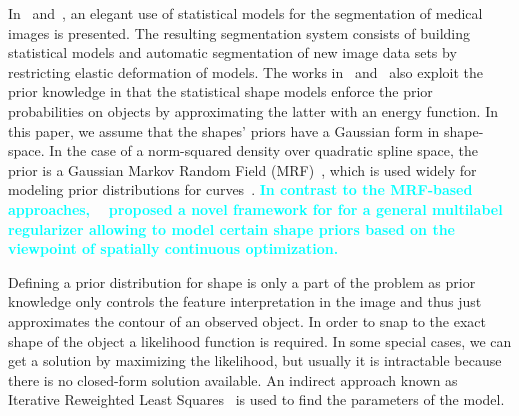 \documentclass[conference]{IEEEtran}
\newcommand{\review}[1]{\textbf{\textcolor{cyan}{#1}}}
\begin{document}
In~\cite{kelemen1999three} and~\cite{kelemen1999elastic}, an elegant
use of statistical models for the segmentation of medical images is
presented. The resulting segmentation system consists of building
statistical models and automatic segmentation of new image data
sets by restricting elastic deformation of models. The works
in~\cite{sclaroff2001deformable} and~\cite{liu1999deformable} also
exploit the prior knowledge in that the statistical shape models enforce the prior
probabilities on objects by approximating the latter with an energy function.  
In this paper, we assume that the shapes' priors have a Gaussian form in
shape-space. In the case of a norm-squared density over  quadratic spline space,
the prior is a Gaussian Markov Random Field (MRF)~\cite{blake1998active}, 
which is used widely  for modeling prior distributions for 
curves~\cite{storvik1994bayesian}. \review{In contrast to the  MRF-based
approaches, ~\cite{gocmo2011} proposed a novel
framework for for a general multilabel regularizer allowing to model
certain shape priors based on the viewpoint of spatially continuous
optimization.}

Defining a prior distribution for shape is only a part of the
problem as prior knowledge only controls the feature interpretation in the
image and thus just approximates the contour of an observed object. In
order to snap to the exact shape of the object a likelihood function is required. In some
special cases, we can get a solution by maximizing the likelihood, but
usually it is intractable because there is no closed-form solution available. 
An indirect approach known as Iterative Reweighted Least Squares~\cite{munk2006convergence} 
is used to find the parameters of the model.
\end{document}
